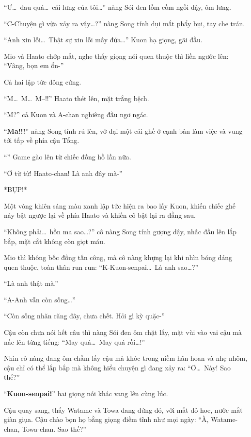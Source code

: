 \documentclass[../main.tex]{subfiles}
\begin{document}
``Ư\dots\ đau quá\dots\ cái lưng của tôi\dots'' nàng Sói đen lồm cồm ngồi dậy, ôm lưng.

``C-Chuyện gì vừa xảy ra vậy\dots?'' nàng Song tính dụi mắt phẩy bụi, tay che trán.

``Anh xin lỗi\dots\ Thật sự xin lỗi mấy đứa\dots'' Kuon hạ giọng, gãi đầu.

Mio và Haato chớp mắt, nghe thấy giọng nói quen thuộc thì liền ngước lên:
``Vâng, bọn em ổn-''

Cả hai lập tức đông cứng.

``M\dots\ M\dots\ M--!!'' Haato thét lên, mặt trắng bệch.

``M?'' cả Kuon và A-chan nghiêng đầu ngơ ngác.

``\textbf{Ma!!!}'' nàng Song tính rú lên, vớ đại một cái ghế ở cạnh bàn làm việc và vung tới tấp về phía cậu Tổng.

``'' Game gào lên từ chiếc đồng hồ lần nữa.

``Ơ từ từ! Haato-chan! Là anh đây mà-''

*BỤP!*

Một vòng khiên sáng màu xanh lập tức hiện ra bao lấy Kuon, khiến chiếc ghế nảy bật ngược lại về phía Haato và khiến cô bật lại ra đằng sau.

``Không phải\dots\ hồn ma sao\dots?'' cô nàng Song tính gượng dậy, nhấc đầu lên lắp bắp, mặt cắt không còn giọt máu.

Mio thì không bốc đồng tấn công, mà cô nàng khựng lại khi nhìn bóng dáng quen thuộc, toàn thân run run: ``K-Kuon-senpai\dots\ Là anh sao\dots?''

``Là anh thật mà.''

``A-Anh vẫn còn sống\dots''

``Còn sống nhăn răng đây, chưa chết. Hỏi gì kỳ quặc-''

Cậu còn chưa nói hết câu thì nàng Sói đen ôm chặt lấy, mặt vùi vào vai cậu mà nấc lên từng tiếng: ``May quá\dots\ May quá rồi\dots!''

Nhìn cô nàng đang ôm chầm lấy cậu mà khóc trong niềm hân hoan và nhẹ nhõm, cậu chỉ có thể lắp bắp mà không hiểu chuyện gì đang xảy ra: ``Ơ\dots\ Này! Sao thế?''

``\textbf{Kuon-senpai!}'' hai giọng nói khác vang lên cùng lúc.

Cậu quay sang, thấy Watame và Towa đang đứng đó, với mắt đỏ hoe, nước mắt giàn giụa. Cậu chào bọn họ bằng giọng điềm tĩnh như mọi ngày: ``À, Watame-chan, Towa-chan. Sao thế?''
\end{document}
